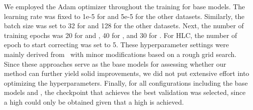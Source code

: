 {We employed the Adam optimizer throughout the training for base models.
The learning rate was fixed to 1e-5 for \tomato{} and 5e-5 for the other datasets.
Similarly, the batch size was set to 32 for \tomato{} and 128 for the other datasets.
Next, the number of training epochs was 20 for \vocseven{} and \voctwelve{}, 40 for \tomato{}, and 30 for \coco. 
For HLC, the number of epoch to start correcting was set to 5. 
These hyperparameter settings were mainly derived from~\cite{xia2023holistic,gehlot2023tomato} with minor modifications based on a rough grid search.
Since these approaches serve as the base models for assessing whether our method can further yield solid improvements, we did not put extensive effort into optimizing the hyperparameters.
Finally, for all configurations including the base models and \method{}, the checkpoint that achieves the best validation \microf{} was selected, since a high \macrof{} could only be obtained given that a high \microf is achieved. 
}
